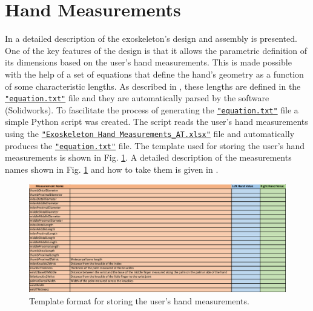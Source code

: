 \section{Hand Measurements}
In \cite{tj_a_taiwo_exoskeleton_2021} a detailed description of the exoskeleton's 
design and assembly is presented. One of the key features of the design is 
that it allows the parametric definition of its dimensions based on the user's
hand measurements. This is made possible with the help of a set of equations that 
define the hand's geometry as a function of some characteristic lengths.
As described in \cite{tj_a_taiwo_exoskeleton_2021}, these 
lengths are defined in the
\texttt{\href{https://tinyurl.com/5ej3n2ud}{"equation.txt"}} file and they are
automatically parsed by the software (Solidworks). To fascilitate the process
of generating 
the \texttt{\href{https://tinyurl.com/5ej3n2ud}{"equation.txt"}} file a
simple Python script was created. The script reads 
the user's hand measurements using the
\texttt{\href{https://tinyurl.com/54d6zw5b}{"Exoskeleton Hand Measurements\_AT.xlsx"}}
file and automatically produces the
\texttt{\href{https://tinyurl.com/5ej3n2ud}{"equation.txt"}} file. The template
used for storing the user's hand measurements is shown in
Fig. \ref{fig:hand_measurements_template}.
A detailed description of the measurements names shown in Fig.
\ref{fig:hand_measurements_template} and how to take them is given
in \cite{tj_a_taiwo_exoskeleton_2021}. 
\begin{figure}
    \centering\includegraphics[width=1.0 \linewidth]{Figures/handmeasurements_template.pdf}
    \caption{Template format for storing the user's hand measurements.}
    \label{fig:hand_measurements_template}
\end{figure}

